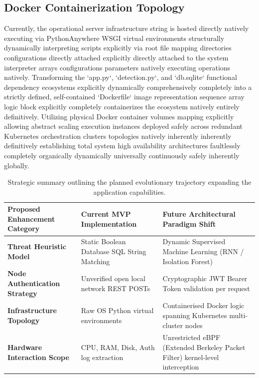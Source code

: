 \subsection{Docker Containerization Topology}
Currently, the operational server infrastructure string is hosted directly natively executing via PythonAnywhere WSGI virtual environments structurally dynamically interpreting scripts explicitly via root file mapping directories configurations directly attached explicitly directly attached to the system interpreter arrays configurations parameters natively executing operations natively. Transforming the `app.py`, `detection.py`, and `db.sqlite` functional dependency ecosystems explicitly dynamically comprehensively completely into a strictly defined, self-contained `Dockerfile` image representation sequence array logic block explicitly completely containerizes the ecosystem natively entirely definitively. Utilizing physical Docker container volumes mapping explicitly allowing abstract scaling execution instances deployed safely across redundant Kubernetes orchestration clusters topologies natively inherently inherently definitively establishing total system high availability architectures faultlessly completely organically dynamically universally continuously safely inherently globally.

\begin{table}[h]
\centering
\small
\begin{tabularx}{\textwidth}{|X|X|X|}
\hline
\textbf{Proposed Enhancement Category} & \textbf{Current MVP Implementation} & \textbf{Future Architectural Paradigm Shift} \\ \hline
\textbf{Threat Heuristic Model} & Static Boolean Database SQL String Matching & Dynamic Supervised Machine Learning (RNN / Isolation Forest) \\ \hline
\textbf{Node Authentication Strategy} & Unverified open local network REST POSTs & Cryptographic JWT Bearer Token validation per request \\ \hline
\textbf{Infrastructure Topology} & Raw OS Python virtual environments & Containerised Docker logic spanning Kubernetes multi-cluster nodes \\ \hline
\textbf{Hardware Interaction Scope} & CPU, RAM, Disk, Auth log extraction & Unrestricted eBPF (Extended Berkeley Packet Filter) kernel-level interception \\ \hline
\end{tabularx}
\caption{Strategic summary outlining the planned evolutionary trajectory expanding the application capabilities.}
\label{tab:future_trajectory}
\end{table}

